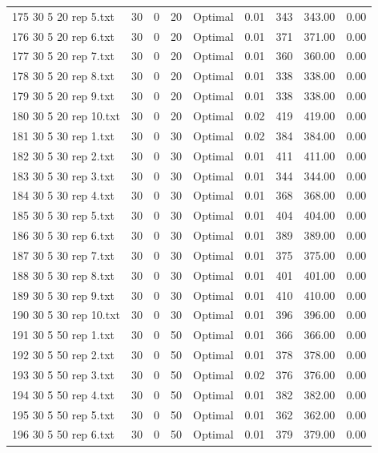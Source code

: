 \begin{longtable}{lrrllrrrr}
175 30 5 20 rep 5.txt & 30 & 0 & 20 & Optimal &  0.01 & 343 & 343.00 &  0.00\\
176 30 5 20 rep 6.txt & 30 & 0 & 20 & Optimal &  0.01 & 371 & 371.00 &  0.00\\
177 30 5 20 rep 7.txt & 30 & 0 & 20 & Optimal &  0.01 & 360 & 360.00 &  0.00\\
178 30 5 20 rep 8.txt & 30 & 0 & 20 & Optimal &  0.01 & 338 & 338.00 &  0.00\\
179 30 5 20 rep 9.txt & 30 & 0 & 20 & Optimal &  0.01 & 338 & 338.00 &  0.00\\
180 30 5 20 rep 10.txt & 30 & 0 & 20 & Optimal &  0.02 & 419 & 419.00 &  0.00\\
181 30 5 30 rep 1.txt & 30 & 0 & 30 & Optimal &  0.02 & 384 & 384.00 &  0.00\\
182 30 5 30 rep 2.txt & 30 & 0 & 30 & Optimal &  0.01 & 411 & 411.00 &  0.00\\
183 30 5 30 rep 3.txt & 30 & 0 & 30 & Optimal &  0.01 & 344 & 344.00 &  0.00\\
184 30 5 30 rep 4.txt & 30 & 0 & 30 & Optimal &  0.01 & 368 & 368.00 &  0.00\\
185 30 5 30 rep 5.txt & 30 & 0 & 30 & Optimal &  0.01 & 404 & 404.00 &  0.00\\
186 30 5 30 rep 6.txt & 30 & 0 & 30 & Optimal &  0.01 & 389 & 389.00 &  0.00\\
187 30 5 30 rep 7.txt & 30 & 0 & 30 & Optimal &  0.01 & 375 & 375.00 &  0.00\\
188 30 5 30 rep 8.txt & 30 & 0 & 30 & Optimal &  0.01 & 401 & 401.00 &  0.00\\
189 30 5 30 rep 9.txt & 30 & 0 & 30 & Optimal &  0.01 & 410 & 410.00 &  0.00\\
190 30 5 30 rep 10.txt & 30 & 0 & 30 & Optimal &  0.01 & 396 & 396.00 &  0.00\\
191 30 5 50 rep 1.txt & 30 & 0 & 50 & Optimal &  0.01 & 366 & 366.00 &  0.00\\
192 30 5 50 rep 2.txt & 30 & 0 & 50 & Optimal &  0.01 & 378 & 378.00 &  0.00\\
193 30 5 50 rep 3.txt & 30 & 0 & 50 & Optimal &  0.02 & 376 & 376.00 &  0.00\\
194 30 5 50 rep 4.txt & 30 & 0 & 50 & Optimal &  0.01 & 382 & 382.00 &  0.00\\
195 30 5 50 rep 5.txt & 30 & 0 & 50 & Optimal &  0.01 & 362 & 362.00 &  0.00\\
196 30 5 50 rep 6.txt & 30 & 0 & 50 & Optimal &  0.01 & 379 & 379.00 &  0.00\\

\end{longtable}
